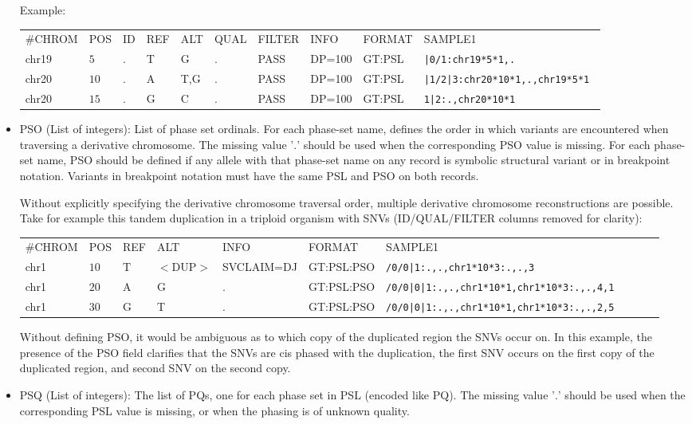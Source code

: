 \documentclass[8pt]{article}
\begin{document}
\begin{itemize}
  Example:
  
  \vspace{0.5em}
  \begin{tabular}{ l l l l l l l l l l}
    \#CHROM & POS & ID & REF & ALT & QUAL & FILTER & INFO & FORMAT & SAMPLE1\\
     chr19 & $5$ & . & T & G & . & PASS & DP=100 &GT:PSL & \tt{|0/1:chr19*5*1,.}\\
    chr20 & $10$ & . & A & T,G & . & PASS & DP=100 &GT:PSL & \tt{|1/2|3:chr20*10*1,.,chr19*5*1} \\
    chr20 & $15$ & . & G & C & . & PASS & DP=100 &GT:PSL & \tt{1|2:.,chr20*10*1}\\
  \end{tabular}
  
  \item PSO (List of integers): List of phase set ordinals.
  For each phase-set name, defines the order in which variants are encountered when traversing a derivative chromosome.
  The missing value '$.$' should be used when the corresponding PSO value is missing.
  For each phase-set name, PSO should be defined if any allele with that phase-set name on any record is symbolic structural variant or in breakpoint notation.
  Variants in breakpoint notation must have the same PSL and PSO on both records.
  
  Without explicitly specifying the derivative chromosome traversal order, multiple derivative chromosome reconstructions are possible.
  Take for example this tandem duplication in a triploid organism with SNVs (ID/QUAL/FILTER columns removed for clarity):
  
  \vspace{0.5em}
  \begin{tabular}{ l l l l l l l l l l}
  \#CHROM & POS & REF & ALT & INFO & FORMAT & SAMPLE1\\
    chr1 & $10$ & T & $<$DUP$>$ & SVCLAIM=DJ & GT:PSL:PSO & \tt{/0/0|1:.,.,chr1*10*3:.,.,3}\\
    chr1 & $20$ & A & G & . & GT:PSL:PSO & \tt{/0/0|0|1:.,.,chr1*10*1,chr1*10*3:.,.,4,1} \\
    chr1 & $30$ & G & T & . & GT:PSL:PSO & \tt{/0/0|0|1:.,.,chr1*10*1,chr1*10*3:.,.,2,5} \\
  \end{tabular}
  
  Without defining PSO, it would be ambiguous as to which copy of the duplicated region the SNVs occur on.
  In this example, the presence of the PSO field clarifies that the SNVs are cis phased with the duplication, the first SNV occurs on the first copy of the duplicated region, and second SNV on the second copy.
  
  \item PSQ (List of integers): The list of PQs, one for each phase set in PSL (encoded like PQ). 
  The missing value '$.$' should be used when the corresponding PSL value is missing, or when the phasing is of unknown quality.
\end{itemize}
\end{document}
